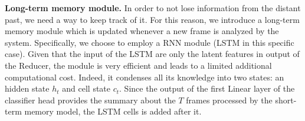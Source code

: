 \noindent\textbf{Long-term memory module.}
In order to not lose information from the distant past, we need a way to keep track of it.
For this reason, we introduce a long-term memory module  which is updated whenever a new frame is analyzed by the system.
Specifically, we choose to employ a RNN module (LSTM \cite{lstm,gru} in this specific case).
Given that the input of the LSTM  are only the latent features in output of the Reducer, the module is very efficient and leads to a limited additional computational cost.
Indeed, it condenses all its knowledge into two states: an hidden state $h_t$ and cell state $c_t$.
Since the output of the first Linear layer of the classifier head provides the summary about the $T$ frames processed by the short-term memory model, the LSTM cells is added after it.

